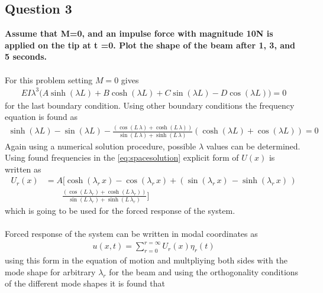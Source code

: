 \documentclass[]{report}
\begin{document}
\subsection*{Question 3}
\textbf{Assume that  M=0, and   an impulse force with magnitude 10N is applied on the tip at t =0. Plot  the shape of the beam after 1, 3, and 5 seconds.}
\\~\\
For this problem setting $M=0$ gives
\begin{align*}
EI \lambda^3\biggl(A\sinh\left(\lambda L\right)+B\cosh\left(\lambda L\right)+C\sin\left(\lambda L\right)-D\cos\left(\lambda L\right)\biggr)=0
\end{align*}
for the last boundary condition. Using other boundary conditions 
the frequency equation is found as
\begin{align*}
\sinh\left(\lambda L\right)-\sin\left(\lambda L\right)- \frac{ \left(\cos\!\left(L\, \lambda\right) + \cosh\!\left(L\, \lambda\right)\right)}{\sin\!\left(L\, \lambda\right) + \sinh\!\left(L\, \lambda\right)}\left(\cosh\left(\lambda L\right)+\cos\left(\lambda L\right)\right)=0
\end{align*}
Again using a numerical solution procedure, possible $\lambda$ values can be determined. Using found frequencies in the \cref{eq:spacesolution} explicit form of $U\left(x\right)$ is written as
\begin{equation}
\begin{split}
U_r\left(x\right)&= A\biggl[\cosh\!\left(\lambda_r\, x\right) - \cos\!\left(\lambda_r\, x\right) +\left(\sin\!\left(\lambda_r\, x\right)\,- \sinh\!\left(\lambda_r\, x\right)\,\right)\\&\quad \quad \frac{ \left(\cos\!\left(L\, \lambda_r\right) + \cosh\!\left(L\, \lambda_r\right)\right)}{\sin\!\left(L\, \lambda_r\right) + \sinh\!\left(L\, \lambda_r\right)}\biggr]
\end{split}
\label{equ:uexpression}
\end{equation}
which is going to be used for the forced response of the system.
\\~\\
Forced response of the system can be written in modal coordinates as
\begin{align}
u\left(x,t\right)=\sum_{r=0}^{r=\infty}U_r\left(x\right)\eta_r\left(t\right)
\label{equ:forcedassumption}
\end{align}
using this form in the equation of motion and multpliying both sides with the mode shape for arbitrary $\lambda_r$ for the beam and using the orthogonality conditions of the different mode shapes it is found that
\end{document}
